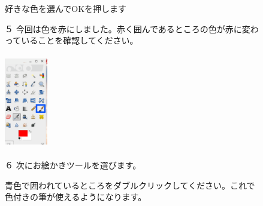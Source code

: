 \documentclass[a4paper,12pt]{jarticle}
\begin{document}
\begin{figure}[ht]
\begin{minipage}{\textwidth}
\begin{minipage}{8.984cm}
      好きな色を選んでOKを押します


      \bigskip
      \begin{minipage}{5.984cm}
        ５
        今回は色を赤にしました。赤く囲んであるところの色が赤に変わっていることを確認してください。


      \end{minipage}
    \end{minipage}
  \end{minipage}

  \includegraphics[width=1.866cm,height=4.15cm]{textbook-img127.png}
  \begin{minipage}[b]{6.663cm}
    ６ 次にお絵かきツールを選びます。

    青色で囲われているところをダブルクリックしてください。これで色付きの筆が使えるようになります。


    \bigskip

  \end{minipage}
\end{figure}
\clearpage
\end{document}
